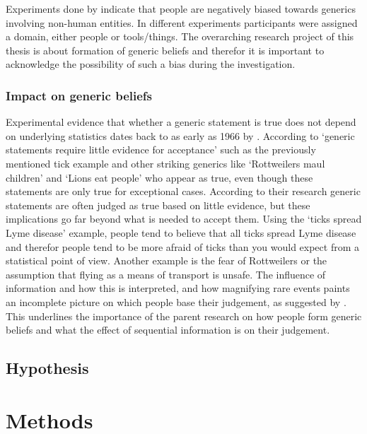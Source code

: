\documentclass[twoside]{uva-inf-bachelor-thesis}
\theoremstyle{definition}
\begin{document}
Experiments done by \cite{tasimi2017differences} indicate that people are negatively biased towards generics involving non-human entities. In different experiments participants were assigned a domain, either people or tools/things. The overarching research project of this thesis is about formation of generic beliefs and therefor it is important to acknowledge the possibility of such a bias during the investigation.

\subsection{Impact on generic beliefs}
Experimental evidence that whether a generic statement is true does not depend on underlying statistics dates back to as early as 1966 by \cite{gilson1965subjective}. According to \cite{cimpian2010generic} `generic statements require little evidence for acceptance' such as the previously mentioned tick example and other striking generics like `Rottweilers maul children' and `Lions eat people' who appear as true, even though these statements are only true for exceptional cases. According to their research generic statements are often judged as true based on little evidence, but these implications go far beyond what is needed to accept them. Using the `ticks spread Lyme disease' example, people tend to believe that all ticks spread Lyme disease and therefor people tend to be more afraid of ticks than you would expect from a statistical point of view. Another example is the fear of Rottweilers or the assumption that flying as a means of transport is unsafe. The influence of information and how this is interpreted, and how magnifying rare events paints an incomplete picture on which people base their judgement, as suggested by \cite{van2020generics}. This underlines the importance of the parent research on how people form generic beliefs and what the effect of sequential information is on their judgement. 

\section{Hypothesis}

\chapter{Methods}
\end{document}
